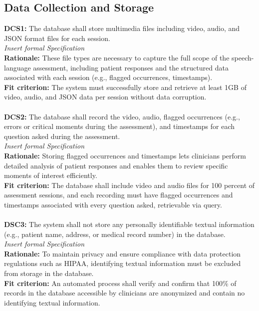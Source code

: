 \documentclass[12pt]{article}
\begin{document}
\subsection{Data Collection and Storage}
\textbf{DCS1: }The database shall store multimedia files including video, audio, and JSON format files for each session.\\
\textit{Insert formal Specification}\\
\textbf{Rationale: }These file types are necessary to capture the full scope of the speech-language assessment, 
including patient responses and the structured data associated with each session (e.g., flagged occurrences, 
timestamps).\\
\textbf{Fit criterion: }The system must successfully store and retrieve at least 1GB of video, audio, and JSON 
data per session without data corruption. \\\\
\textbf{DCS2: }The database shall record the video, audio, flagged occurrences (e.g., errors or critical moments
 during the assessment), and timestamps for each question asked during the assessment.\\
\textit{Insert formal Specification}\\
\textbf{Rationale: }Storing flagged occurrences and timestamps lets clinicians perform detailed analysis 
of patient responses and enables them to review specific moments of interest efficiently.\\
\textbf{Fit criterion: }The database shall include video and audio files for 100 percent of assessment sessions,
 and each recording must have flagged occurrences and timestamps associated with every question asked, 
 retrievable via query. \\\\
\textbf{DSC3: }The system shall not store any personally identifiable textual information (e.g., patient name, address, 
or medical record number) in the database.\\
\textit{Insert formal Specification}\\
\textbf{Rationale: }To maintain privacy and ensure compliance with data protection regulations such as HIPAA, 
identifying textual information must be excluded from storage in the database.\\
\textbf{Fit criterion: }An automated process shall verify and confirm that 100\% of records in the database 
accessible by clinicians are anonymized and contain no identifying textual information.\\\\
\end{document}
